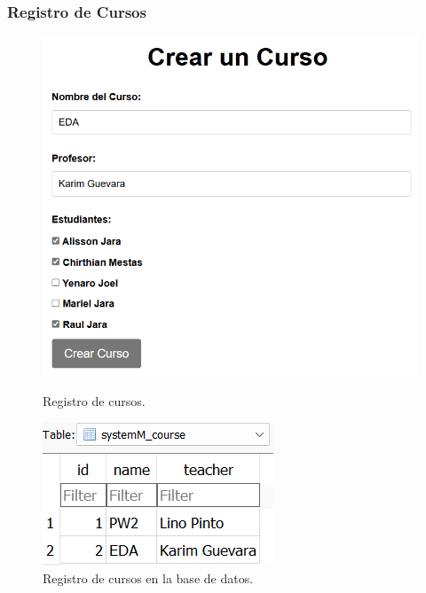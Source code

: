 \documentclass{article}
\begin{document}
\subsubsection{Registro de Cursos}
\begin{figure}[H]
	\centering
	\begin{minipage}{0.3\textwidth}
		\centering
		\includegraphics[width=\linewidth,keepaspectratio]{img/registerCourse.png}
		\caption{Registro de cursos.}
	\end{minipage}\hfill
	\begin{minipage}{0.3\textwidth}
		\centering
		\includegraphics[width=\linewidth,keepaspectratio]{img/registerCBD.png}
		\caption{Registro de cursos en la base de datos.}

\end{minipage}
\end{figure}
\end{document}
